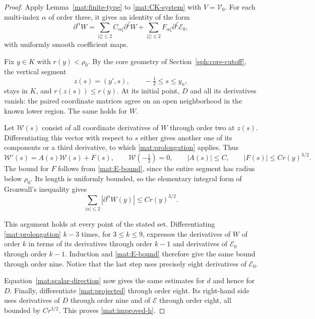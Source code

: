 \begin{proof}
Apply Lemma~\ref{mat:finite-type} to
\eqref{mat:CK-system} with $V=\mathcal V_0$.  For each multi-index
$\alpha$ of order three, it gives an identity of the form
\begin{equation}
 \partial^\alpha W
       =\sum_{|\zeta|\le2}C_{\alpha\zeta}\partial^\zeta W
         +\sum_{|\zeta|\le2}F_{\alpha\zeta}
                                       \partial^\zeta\mathcal E_0,
 \label{mat:prolongation}
\end{equation}
with uniformly smooth coefficient maps.

Fix $y\in K$ with $r(y)<\rho_0$.  By the core geometry of
Section~\ref{sph:core-cutoff}, the vertical segment
\[
 z(s)=(y',s),\qquad -\tfrac12\le s\le y_n,
\]
stays in $K$, and $r(z(s))\le r(y)$.  At its initial point, $D$ and
all its derivatives vanish: the paired coordinate matrices agree on
an open neighborhood in the known lower region.  The same holds for
$W$.

Let $\mathcal W(s)$ consist of all coordinate derivatives of $W$
through order two at $z(s)$.  Differentiating this vector with respect
to $s$ either gives another one of its components or a third
derivative, to which \eqref{mat:prolongation} applies.  Thus
\[
 \mathcal W'(s)=A(s)\mathcal W(s)+F(s),
 \qquad \mathcal W(-\tfrac12)=0,
 \qquad |A(s)|\le C,
 \qquad |F(s)|\le Cr(y)^{3/2}.
\]
The bound for $F$ follows from \eqref{mat:E-bound}, since the entire
segment has radius below $\rho_0$.  Its length is uniformly bounded,
so the elementary integral form of Gronwall's inequality gives
\[
       \sum_{|\alpha|\le2}|\partial^\alpha W(y)|
                                             \le Cr(y)^{3/2}.
\]

This argument holds at every point of the stated set.  Differentiating
\eqref{mat:prolongation} $k-3$ times, for $3\le k\le9$, expresses
the derivatives of $W$ of order $k$ in terms of its derivatives
through order $k-1$ and derivatives of $\mathcal E_0$ through order
$k-1$.  Induction and \eqref{mat:E-bound} therefore give the same
bound through order nine.  Notice that the last step uses precisely
eight derivatives of $\mathcal E_0$.

Equation~\eqref{mat:scalar-direction} now gives the same estimates for
$d$ and hence for $D$.  Finally, differentiate
\eqref{mat:projected} through order eight.  Its right-hand side uses
derivatives of $D$ through order nine and of $\mathcal E$ through
order eight, all bounded by $Cr^{3/2}$.  This proves
\eqref{mat:improved-h}.
\end{proof}

